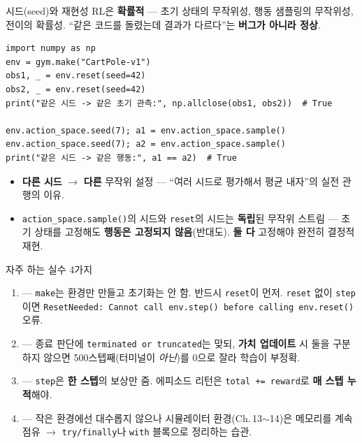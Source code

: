 \documentclass[aspectratio=169,11pt]{beamer}
\begin{document}
\begin{frame}[fragile]{시드(seed)와 재현성}
  RL은 \textbf{확률적} --- 초기 상태의 무작위성, 행동 샘플링의
  무작위성, 전이의 확률성. ``같은 코드를 돌렸는데 결과가 다르다''는
  \textbf{버그가 아니라 정상}.
\begin{lstlisting}
import numpy as np
env = gym.make("CartPole-v1")
obs1, _ = env.reset(seed=42)
obs2, _ = env.reset(seed=42)
print("같은 시드 -> 같은 초기 관측:", np.allclose(obs1, obs2))  # True

env.action_space.seed(7); a1 = env.action_space.sample()
env.action_space.seed(7); a2 = env.action_space.sample()
print("같은 시드 -> 같은 행동:", a1 == a2)  # True
\end{lstlisting}
  \begin{itemize}
    \item \textbf{다른 시드} $\to$ \textbf{다른} 무작위 설정 ---
      ``여러 시드로 평가해서 평균 내자''의 실전 관행의 이유.
    \item \texttt{action\_space.sample()}의 시드와
      \texttt{reset}의 시드는 \textbf{독립}된 무작위 스트림 ---
      초기 상태를 고정해도 \textbf{행동은 고정되지 않음}(반대도).
      \textbf{둘 다} 고정해야 완전히 결정적 재현.
  \end{itemize}
\end{frame}

\begin{frame}{자주 하는 실수 4가지}
  \begin{enumerate}
    \item {} ---
      \texttt{make}는 환경만 만들고 초기화는 안 함. 반드시
      \texttt{reset}이 먼저. \texttt{reset} 없이 \texttt{step}이면
      \texttt{ResetNeeded: Cannot call env.step() before calling
      env.reset()} 오류.
    \item {} --- 종료 판단에
      \texttt{terminated or truncated}는 맞되, \textbf{가치 업데이트}
      시 둘을 구분하지 않으면 500스텝째(터미널이 \textit{아닌})를
      0으로 잘라 학습이 부정확.
    \item {} --- \texttt{step}은
      \textbf{한 스텝}의 보상만 줌. 에피소드 리턴은
      \texttt{total += reward}로 \textbf{매 스텝 누적}해야.
    \item {} --- 작은 환경에선
      대수롭지 않으나 시뮬레이터 환경(Ch.\,13$\sim$14)은 메모리를
      계속 점유 $\to$ \texttt{try/finally}나 \texttt{with} 블록으로
      정리하는 습관.
  \end{enumerate}
\end{frame}
\end{document}
